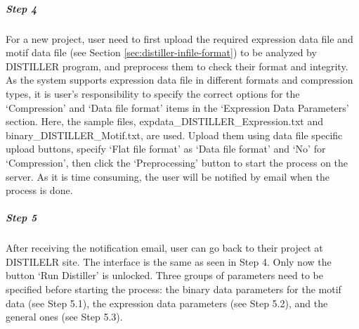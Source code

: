 \begin{small} %
\subparagraph{Step 4} For a new project, user need to first upload the required 
expression data file and motif data file (see Section
\ref{sec:distiller-infile-format}) to be analyzed by DISTILLER program, and
preprocess them to check their format and integrity.  As the system supports
expression data file in different formats and compression types, it is user's
responsibility to specify the correct options for the `Compression' and `Data
file format' items in the `Expression Data Parameters' section.
%
Here, the sample files, expdata\_DISTILLER\_Expression.txt and
binary\_DISTILLER\_Motif.txt, are used.  Upload them using data file specific
upload buttons, specify `Flat file format' as `Data file format' and `No' for
`Compression', then click the `Preprocessing' button to start the process on
the server.
%
As it is time consuming, the user will be notified by email when the process
is done.


\subparagraph{Step 5} After receiving the notification email, user can go back to 
their project at DISTILELR site.  The interface is the same as seen in Step 4.
Only now the button `Run Distiller' is unlocked.  Three groups of parameters
need to be specified before starting the process: the binary data parameters
for the motif data (see Step 5.1), the expression data parameters (see Step
5.2), and the general ones (see Step 5.3).



\end{small}
